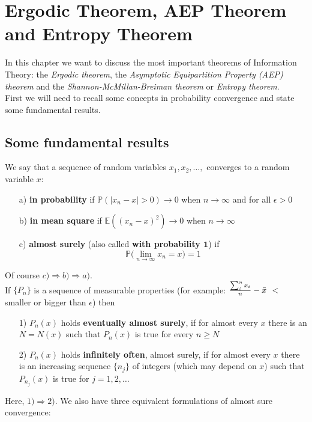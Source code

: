\chapter{Ergodic Theorem, AEP Theorem and Entropy Theorem}
In this chapter we want to discuss the most important theorems of Information Theory: the \textit{Ergodic theorem}, the \textit{Asymptotic Equipartition Property (AEP) theorem} and the \textit{Shannon-McMillan-Breiman theorem} or \textit{Entropy theorem}.
\\First we will need to recall some concepts in probability convergence and state some fundamental results.

\section{Some fundamental results}
We say that a sequence of random variables $x_1, x_2, \dots, $ converges to a random variable $x$:
\begin{itemize}
    \item[a)] \textbf{in probability} if $\mathbb{P}(|x_n - x| > 0) \rightarrow 0$ when $n \rightarrow \infty$ and for all $\epsilon >0$
    \item[b)] \textbf{in mean square} if $\mathbb{E}( (x_n - x)^2 ) \rightarrow 0$ when $n \rightarrow \infty$
    \item[c)] \textbf{almost surely} (also called \textbf{with probability $\bm{1}$}) if 
    \begin{equation}
        \mathbb{P} \big( \lim_{n \rightarrow \infty} x_n = x \big) = 1
    \end{equation}
\end{itemize}
Of course $c) \Rightarrow b) \Rightarrow a)$. \\
If $\{P_n\}$ is a sequence of measurable properties (for example: $\frac{\sum_i^n x_i}{n} - \Bar{x}$ $<$ smaller or bigger than $\epsilon$) then
\begin{itemize}
    \item[1)] $P_n(x)$ holds \textbf{eventually almost surely}, if for almost every $x$ there is an $N=N(x)$ such that $P_n(x)$ is true for every $n \geq N$
    \item[2)] $P_n(x)$ holds \textbf{infinitely often}, almost surely, if for almost every $x$ there is an increasing sequence $\{n_j \}$ of integers (which may depend on $x$) such that $P_{n_j}(x)$ is true for $j = 1,2, \dots$
\end{itemize}
Here, $1) \Rightarrow 2)$. We also have three equivalent formulations of almost sure convergence:
